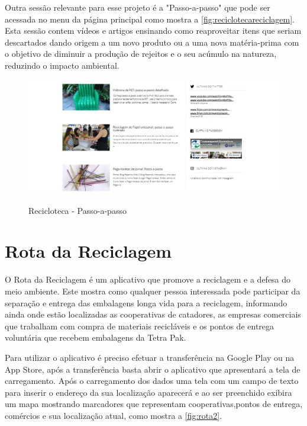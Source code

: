 \documentclass[
	12pt,				%
	openright,			%
	twoside,			%
	a4paper,			%
	english,			%
	french,				%
	spanish,			%
	brazil				%
	]{abntex2}
\begin{document}
\newpage
Outra sessão relevante para esse projeto é a "Passo-a-passo" que pode ser acessada no menu da página principal como mostra a \autoref{fig:reciclotecareciclagem}. Esta sessão contem vídeos e artigos ensinando como reaproveitar itens que seriam descartados dando origem a um novo produto ou a uma nova matéria-prima com o objetivo de diminuir a produção de rejeitos e o seu acúmulo na natureza, reduzindo o impacto ambiental.


\begin{figure}[h]
\centering
   \caption{Recicloteca - Passo-a-passo}
   \includegraphics[scale=0.45]{media/reciclotecareciclagem.jpg}
     \label{fig:reciclotecareciclagem}
\end{figure}



\newpage
\section{Rota da Reciclagem}

O Rota da Reciclagem é um aplicativo que promove a reciclagem e a defesa do meio ambiente. Este mostra como qualquer pessoa interessada pode participar da separação e entrega das embalagens longa vida para a reciclagem, informando ainda onde estão localizadas as cooperativas de catadores, as empresas comerciais que trabalham com compra de materiais recicláveis e os pontos de entrega voluntária que recebem embalagens da Tetra Pak\cite{tetrapark}.

Para utilizar o aplicativo é preciso efetuar a transferência na Google Play\cite{googleplay} ou na App Store\cite{appstore}, após a transferência basta abrir o aplicativo que apresentará a tela de carregamento. Após o carregamento dos dados uma tela com um campo de texto para inserir o endereço da sua localização aparecerá e ao ser preenchido exibira um mapa mostrando marcadores que representam cooperativas,pontos de entrega, comércios e sua localização atual, como mostra a \autoref{fig:rota2}.
    
\end{document}
